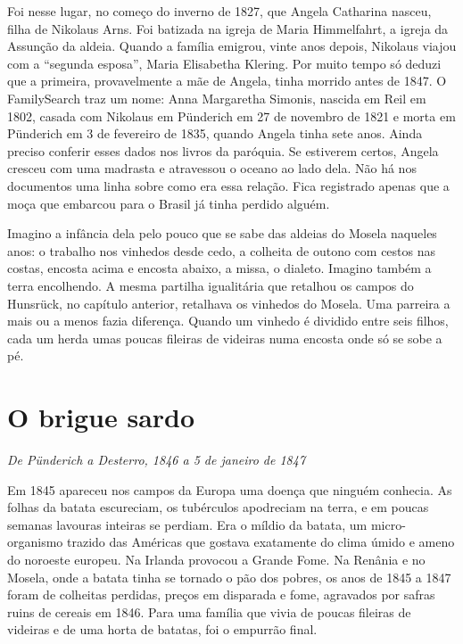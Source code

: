 \documentclass[
  brazilian,
  11pt,
  openany]{book}
\begin{document}
Foi nesse lugar, no começo do inverno de 1827, que Angela Catharina
nasceu, filha de Nikolaus Arns. Foi batizada na igreja de Maria
Himmelfahrt, a igreja da Assunção da aldeia. Quando a família emigrou,
vinte anos depois, Nikolaus viajou com a ``segunda esposa'', Maria
Elisabetha Klering. Por muito tempo só deduzi que a primeira,
provavelmente a mãe de Angela, tinha morrido antes de 1847. O
FamilySearch traz um nome: Anna Margaretha Simonis, nascida em Reil em
1802, casada com Nikolaus em Pünderich em 27 de novembro de 1821 e morta
em Pünderich em 3 de fevereiro de 1835, quando Angela tinha sete anos.
Ainda preciso conferir esses dados nos livros da paróquia. Se estiverem
certos, Angela cresceu com uma madrasta e atravessou o oceano ao lado
dela. Não há nos documentos uma linha sobre como era essa relação. Fica
registrado apenas que a moça que embarcou para o Brasil já tinha perdido
alguém.

Imagino a infância dela pelo pouco que se sabe das aldeias do Mosela
naqueles anos: o trabalho nos vinhedos desde cedo, a colheita de outono
com cestos nas costas, encosta acima e encosta abaixo, a missa, o
dialeto. Imagino também a terra encolhendo. A mesma partilha igualitária
que retalhou os campos do Hunsrück, no capítulo anterior, retalhava os
vinhedos do Mosela. Uma parreira a mais ou a menos fazia diferença.
Quando um vinhedo é dividido entre seis filhos, cada um herda umas
poucas fileiras de videiras numa encosta onde só se sobe a pé.

\section{O brigue sardo}\label{o-brigue-sardo}

\emph{De Pünderich a Desterro, 1846 a 5 de janeiro de 1847}

Em 1845 apareceu nos campos da Europa uma doença que ninguém conhecia.
As folhas da batata escureciam, os tubérculos apodreciam na terra, e em
poucas semanas lavouras inteiras se perdiam. Era o míldio da batata, um
micro-organismo trazido das Américas que gostava exatamente do clima
úmido e ameno do noroeste europeu. Na Irlanda provocou a Grande Fome. Na
Renânia e no Mosela, onde a batata tinha se tornado o pão dos pobres, os
anos de 1845 a 1847 foram de colheitas perdidas, preços em disparada e
fome, agravados por safras ruins de cereais em 1846. Para uma família
que vivia de poucas fileiras de videiras e de uma horta de batatas, foi
o empurrão final.
\end{document}
